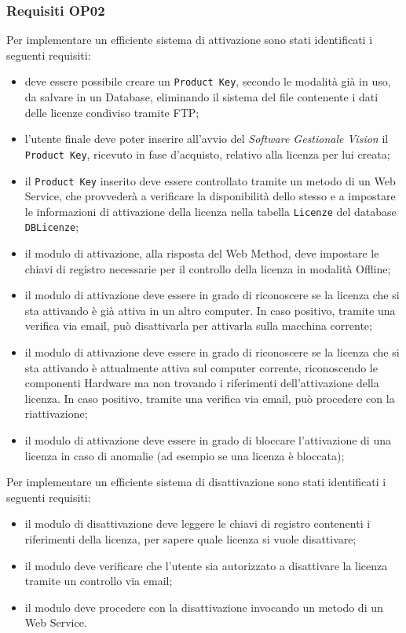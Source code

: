\subsubsection{Requisiti OP02} 
Per implementare un efficiente sistema di attivazione sono stati identificati i seguenti requisiti:
\begin{itemize}
\item deve essere possibile creare un \texttt{Product Key}, secondo le modalità già in uso, da salvare in un Database, eliminando il sistema del file contenente i dati delle licenze condiviso tramite FTP;
\item l'utente finale deve poter inserire all'avvio del \textit{Software Gestionale Vision} il \texttt{Product Key}, ricevuto in fase d'acquisto, relativo alla licenza per lui creata;
\item il \texttt{Product Key} inserito deve essere controllato tramite un metodo di un Web Service, che provvederà a verificare la disponibilità dello stesso e a impostare le informazioni di attivazione della licenza nella tabella \texttt{Licenze} del database \texttt{DBLicenze};
\item il modulo di attivazione, alla risposta del Web Method, deve impostare le chiavi di registro necessarie per il controllo della licenza in modalità Offline;
\item il modulo di attivazione deve essere in grado di riconoscere se la licenza che si sta attivando è già attiva in un altro computer. In caso positivo, tramite una verifica via email, può disattivarla per attivarla sulla macchina corrente;
\item il modulo di attivazione deve essere in grado di riconoscere se la licenza che si sta attivando è attualmente attiva sul computer corrente, riconoscendo le componenti Hardware ma non trovando i riferimenti dell'attivazione della licenza. In caso positivo, tramite una verifica via email, può procedere con la riattivazione;
\item il modulo di attivazione deve essere in grado di bloccare l'attivazione di una licenza in caso di anomalie (ad esempio se una licenza è bloccata);

\end{itemize} 

Per implementare un efficiente sistema di disattivazione sono stati identificati i seguenti requisiti:


\begin{itemize}
\item il modulo di disattivazione deve leggere le chiavi di registro contenenti i riferimenti della licenza, per sapere quale licenza si vuole disattivare;
\item il modulo deve verificare che l'utente sia autorizzato a disattivare la licenza tramite un controllo via email;
\item il modulo deve procedere con la disattivazione invocando un metodo di un Web Service.
\end{itemize}

